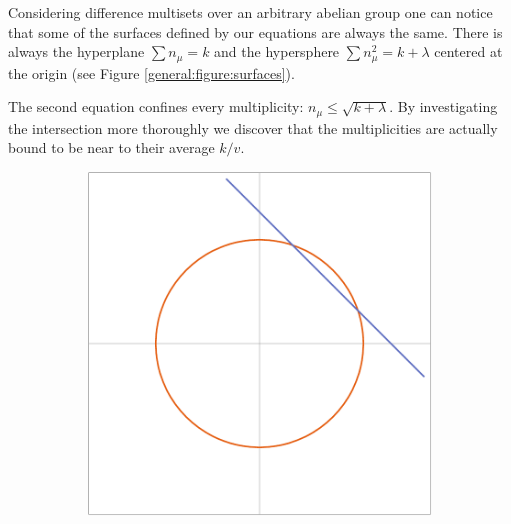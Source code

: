 Considering difference multisets over an arbitrary abelian group one can notice that some of the surfaces defined by our equations are always the same. There is always the hyperplane $\sum {n_\mu} = k$ and the hypersphere $\sum n_\mu^2 = k + \lambda$ centered at the origin (see Figure \ref{general:figure:surfaces}). 

The second equation confines every multiplicity: $n_\mu \leq \sqrt{k+\lambda}$. By investigating the intersection more thoroughly we discover that the multiplicities are actually bound to be near to their average $k/v$.

\begin{figure}
	\centering
	\begin{subfigure}[b]{0.5\textwidth}
		\includegraphics[width=\textwidth]{assets/surfacesIn2D}
	\end{subfigure}%
	~
	\begin{subfigure}[b]{0.5\textwidth}

\end{subfigure}
\end{figure}
